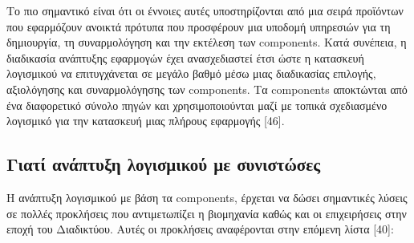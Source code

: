 	Το πιο σημαντικό είναι ότι οι έννοιες αυτές υποστηρίζονται από μια σειρά προϊόντων που εφαρμόζουν ανοικτά πρότυπα που προσφέρουν μια υποδομή υπηρεσιών για τη δημιουργία, τη συναρμολόγηση και την εκτέλεση των components. Κατά συνέπεια, η διαδικασία ανάπτυξης εφαρμογών έχει ανασχεδιαστεί έτσι ώστε η κατασκευή λογισμικού να επιτυγχάνεται σε μεγάλο βαθμό μέσω μιας διαδικασίας επιλογής, αξιολόγησης και συναρμολόγησης των components. Τα components αποκτώνται από ένα διαφορετικό σύνολο πηγών και χρησιμοποιούνται μαζί με τοπικά σχεδιασμένο λογισμικό για την κατασκευή μιας πλήρους εφαρμογής [46].
	
\subsection{Γιατί ανάπτυξη λογισμικού με συνιστώσες}
Η ανάπτυξη λογισμικού με βάση τα components, έρχεται να δώσει σημαντικές λύσεις σε πολλές προκλήσεις που αντιμετωπίζει η βιομηχανία καθώς και οι επιχειρήσεις στην εποχή του Διαδικτύου. Αυτές οι προκλήσεις αναφέρονται στην επόμενη λίστα [40]: 

